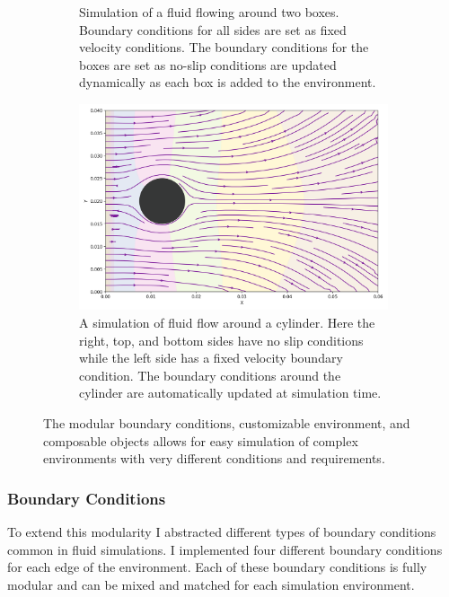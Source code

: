 \begin{figure}[!ht]
\begin{subfigure}{.28\textwidth}
        \caption{Simulation of a fluid flowing around two boxes. Boundary conditions for all sides are set as fixed velocity conditions. The boundary conditions for the boxes are set as no-slip conditions are updated dynamically as each box is added to the environment.}
        \label{fig:sub12}
    \end{subfigure}
    \hspace{0.04\textwidth}
    \begin{subfigure}{.28\textwidth}
        \centering
        \includegraphics[width=\linewidth]{Figures/cylinder_example_streamline.png}
        \caption{A simulation of fluid flow around a cylinder. Here the right, top, and bottom sides have no slip conditions while the left side has a fixed velocity boundary condition. The boundary conditions around the cylinder are automatically updated at simulation time.}
        \label{fig:sub13}
    \end{subfigure}
    \caption{The modular boundary conditions, customizable environment, and composable objects allows for easy simulation of complex environments with very different conditions and requirements.}
    \label{fig:fluid_flow_cylinder_ns_fdm}
\end{figure}


\subsubsection{Boundary Conditions}
To extend this modularity I abstracted different types of boundary conditions common in fluid simulations.
I implemented four different boundary conditions for each edge of the environment.
Each of these boundary conditions is fully modular and can be mixed and matched for each simulation environment.

